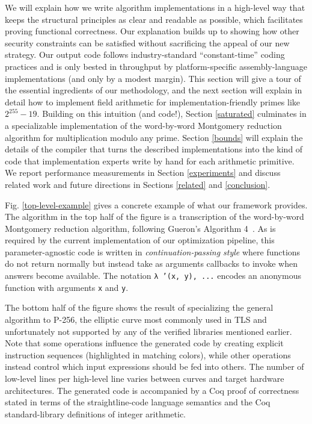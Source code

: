 \documentclass[conference,letterpaper]{IEEEtran}
\begin{document}
We will explain how we write algorithm implementations in a high-level way that keeps the structural principles as clear and readable as possible, which facilitates proving functional correctness.
Our explanation builds up to showing how other security constraints can be satisfied without sacrificing the appeal of our new strategy.
Our output code follows industry-standard ``constant-time'' coding practices and is only bested in throughput by platform-specific assembly-language implementations (and only by a modest margin).
This section will give a tour of the essential ingredients of our methodology, and the next section will explain in detail how to implement field arithmetic for implementation-friendly primes like $2^{255}-19$.
Building on this intuition (and code!), Section \ref{saturated} culminates in a specializable implementation of the word-by-word Montgomery reduction algorithm for multiplication modulo any prime.
Section \ref{bounds} will explain the details of the compiler that turns the described implementations into the kind of code that implementation experts write by hand for each arithmetic primitive.
We report performance measurements in Section \ref{experiments} and discuss related work and future directions in Sections \ref{related} and \ref{conclusion}.

Fig. \ref{top-level-example} gives a concrete example of what our framework provides.
The algorithm in the top half of the figure is a transcription of the word-by-word Montgomery reduction algorithm, following Gueron's Algorithm 4~\cite{montexp2011}.
As is required by the current implementation of our optimization pipeline, this parameter-agnostic code is written in \emph{continuation-passing style} where functions do not return normally but instead take as arguments callbacks to invoke when answers become available.
The notation \mbox{\small\texttt{λ '(x, y), ...}} encodes an anonymous function with arguments \texttt{\small x} and \texttt{\small y}.

The bottom half of the figure shows the result of specializing the general algorithm to P-256, the elliptic curve most commonly used in TLS and unfortunately not supported by any of the verified libraries mentioned earlier.
Note that some operations influence the generated code by creating explicit instruction sequences (highlighted in matching colors), while other operations instead control which input expressions should be fed into others.
The number of low-level lines per high-level line varies between curves and target hardware architectures.
The generated code is accompanied by a Coq proof of correctness stated in terms of the straightline-code language semantics and the Coq standard-library definitions of integer arithmetic.
\end{document}
